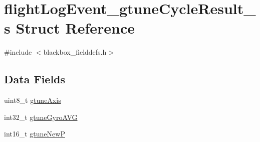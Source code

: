 \hypertarget{structflightLogEvent__gtuneCycleResult__s}{\section{flight\+Log\+Event\+\_\+gtune\+Cycle\+Result\+\_\+s Struct Reference}
\label{structflightLogEvent__gtuneCycleResult__s}
}


{\ttfamily \#include $<$blackbox\+\_\+fielddefs.\+h$>$}

\subsection*{Data Fields}
\begin{DoxyCompactItemize}
\item 
uint8\+\_\+t \hyperlink{structflightLogEvent__gtuneCycleResult__s_a458bf2f869cc0e8e6ba6ca20df069414}{gtune\+Axis}
\item 
int32\+\_\+t \hyperlink{structflightLogEvent__gtuneCycleResult__s_ab2720b466adf125e5e79138f031f0c03}{gtune\+Gyro\+A\+V\+G}
\item 
int16\+\_\+t \hyperlink{structflightLogEvent__gtuneCycleResult__s_a19df099da2506a45aa9ba82856d83259}{gtune\+New\+P}
\end{DoxyCompactItemize}



